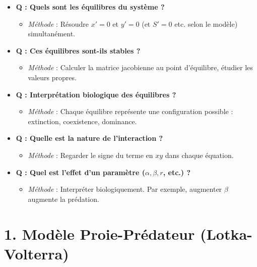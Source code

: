 \documentclass{article}
\begin{document}
\begin{itemize}
  \item \textbf{Q : Quels sont les équilibres du système ?}
  \begin{itemize}
    \item \textit{Méthode} : Résoudre $x'=0$ et $y'=0$ (et $S'=0$ etc. selon le modèle) simultanément.
  \end{itemize}
  \item \textbf{Q : Ces équilibres sont-ils stables ?}
  \begin{itemize}
    \item \textit{Méthode} : Calculer la matrice jacobienne au point d'équilibre, étudier les valeurs propres.
  \end{itemize}
  \item \textbf{Q : Interprétation biologique des équilibres ?}
  \begin{itemize}
    \item \textit{Méthode} : Chaque équilibre représente une configuration possible : extinction, coexistence, dominance.
  \end{itemize}
  \item \textbf{Q : Quelle est la nature de l’interaction ?}
  \begin{itemize}
    \item \textit{Méthode} : Regarder le signe du terme en $xy$ dans chaque équation.
  \end{itemize}
  \item \textbf{Q : Quel est l’effet d’un paramètre (\(\alpha, \beta, r\), etc.) ?}
  \begin{itemize}
    \item \textit{Méthode} : Interpréter biologiquement. Par exemple, augmenter $\beta$ augmente la prédation.
  \end{itemize}
\end{itemize}

\section*{1. Modèle Proie-Prédateur (Lotka-Volterra)}
\end{document}
